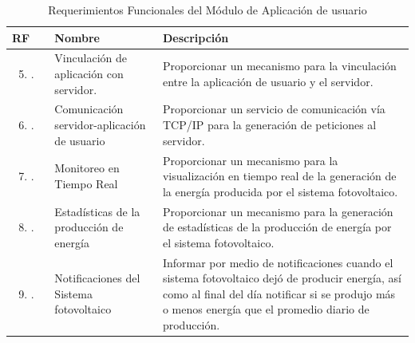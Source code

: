 \begin{longtable}{|M{1.6cm}|M{4.0cm}|M{6.0cm}|}
    \caption{Requerimientos Funcionales del Módulo de Aplicación de usuario}
	\hline
	\textbf{RF} & \textbf{Nombre} & \textbf{Descripción} \\
	\hline
 	\begin{enumerate}[label=RF\arabic*]
 	    \setcounter{enumi}{4}
 	    \item.
 	\end{enumerate}
 	& Vinculación de aplicación con servidor.
 	& Proporcionar un mecanismo para la vinculación entre la aplicación de usuario y el servidor.\\
    \hline
    \begin{enumerate}[label=RF\arabic*]
        \setcounter{enumi}{5}
 	    \item.
 	\end{enumerate}
 	& Comunicación servidor-aplicación de usuario 
 	& Proporcionar un servicio de comunicación vía TCP/IP para la generación de peticiones al servidor. \\
    \hline
    \begin{enumerate}[label=RF\arabic*]
        \setcounter{enumi}{6}
 	    \item.
 	\end{enumerate}
 	& Monitoreo en Tiempo Real 
 	& Proporcionar un mecanismo para la visualización en tiempo real de la generación  de la energía producida por el sistema fotovoltaico. \\
    \hline
    \begin{enumerate}[label=RF\arabic*]
        \setcounter{enumi}{7}
 	    \item.
 	\end{enumerate}
 	& Estadísticas de la producción de energía 
 	& Proporcionar un mecanismo para la generación de estadísticas de la producción de energía por el sistema fotovoltaico. \\
    \hline
    \begin{enumerate}[label=RF\arabic*]
        \setcounter{enumi}{8}
 	    \item.
 	\end{enumerate}
 	& Notificaciones del Sistema fotovoltaico 
 	& Informar por medio de notificaciones cuando el sistema fotovoltaico dejó de producir energía, así como al final del día notificar si se produjo más o menos energía que el promedio diario de producción. \\
    \hline
\end{longtable}